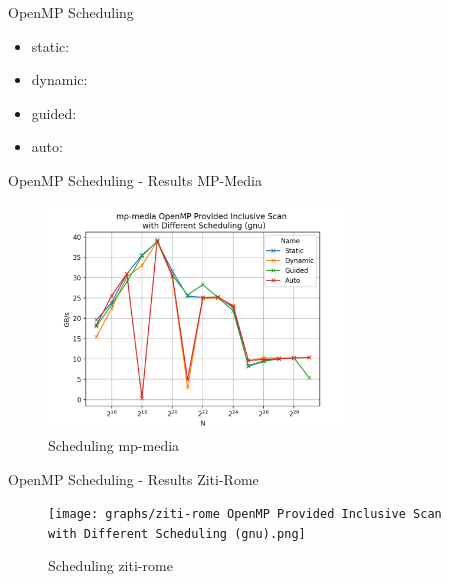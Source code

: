 \begin{frame}{OpenMP Scheduling}
	\begin{itemize}
	\item static: 
	\item dynamic: 
	\item guided:
	\item auto:
\end{itemize}
	
	
\end{frame} 

\begin{frame}{OpenMP Scheduling - Results MP-Media}
	\begin{figure}
		\includegraphics[width=80mm]{graphs/mp-media OpenMP Provided Inclusive Scan  with Different Scheduling (gnu).png}
		\caption{{Scheduling mp-media}}
	\end{figure}
\end{frame}

\begin{frame}{OpenMP Scheduling - Results Ziti-Rome}
	\begin{figure}
		\texttt{[image: graphs/ziti-rome OpenMP Provided Inclusive Scan  with Different Scheduling (gnu).png]}
		\caption{{Scheduling ziti-rome}}
	\end{figure}
\end{frame}